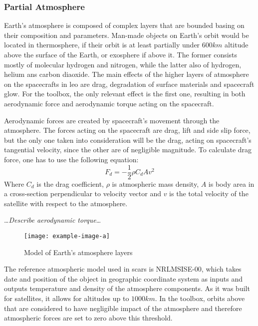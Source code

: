     \subsubsection{Partial Atmosphere}\label{toolbox:atmosphere}
        Earth's atmosphere is composed of complex layers that are bounded basing on their composition and parameters. Man-made objects on Earth's orbit would be located in thermosphere, if their orbit is at least partially under $600km$ altitude above the surface of the Earth, or exosphere if above it. The former consists mostly of molecular hydrogen and nitrogen, while the latter also of hydrogen, helium ans carbon diaoxide. The main effects of the higher layers of atmosphere on the spacecrafts in \ac{leo} are drag, degradation of surface materials and spacecraft glow. For the toolbox, the only relevant effect is the first one, resulting in both aerodynamic force and aerodynamic torque acting on the spacecraft.

        Aerodynamic forces are created by spacecraft's movement through the atmosphere. The forces acting on the spacecraft are drag, lift and side slip force, but the only one taken into consideration will be the drag, acting on spacecraft's tangential velocity, since the other are of negligible magnitude. To calculate drag force, one has to use the following equation:
        \begin{equation}
            F_d = -\frac{1}{2}\rho C_d A v^2
        \end{equation}
        Where $C_d$ is the drag coefficient, $\rho$ is atmospheric mass density, $A$ is body area in a cross-section perpendicular to velocity vector and $v$ is the total velocity of the satellite with respect to the atmosphere. 

        \dots\textit{Describe aerodynamic torque}\dots

        \begin{figure}[H]
            \centering
            \texttt{[image: example-image-a]}
            \caption{Model of Earth's atmosphere layers}
            \label{fig:atmosphere}
        \end{figure}

        The reference atmospheric model used in \ac{scars} is NRLMSISE-00, which takes date and position of the object in geographic coordinate system as inputs and outputs temperature and density of the atmosphere components. As it was built for satellites, it allows for altitudes up to $1000km$. In the toolbox, orbits above that are considered to have negligible impact of the atmosphere and therefore atmospheric forces are set to zero above this threshold.

